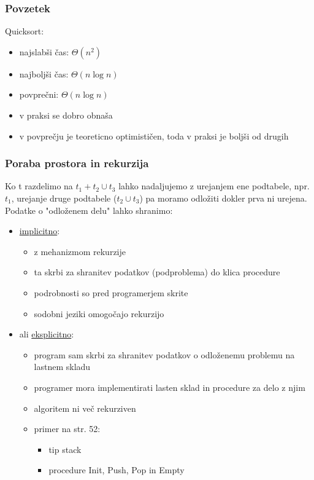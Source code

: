 \documentclass[a4paper,10pt]{article}
\begin{document}
\subsubsection{Povzetek}
Quicksort:
\begin{itemize}
\item najslab\v si  \v cas:  $\Theta(n^2)$
\item najbolj\v si  \v cas: $\Theta(n\log n)$
\item povpre\v cni: $\Theta (n\log n)$
\item v praksi se dobro obna\v sa
\item v povpre\v cju je teoreticno optimisti\v cen, toda v praksi je bolj\v si od drugih
\end{itemize}

\subsubsection{Poraba prostora in rekurzija}
Ko t razdelimo na $t_1 + t_2 \cup t_3$ lahko nadaljujemo z urejanjem ene podtabele, npr. $t_1$, urejanje druge podtabele ($t_2 \cup t_3$) pa moramo odlo\v ziti dokler prva ni urejena. Podatke o "odlo\v zenem delu" lahko shranimo:
\begin{itemize}
\item \underline{implicitno}:
	\begin{itemize}
	\item z mehanizmom rekurzije
	\item ta skrbi za shranitev podatkov (podproblema) do klica procedure
	\item podrobnosti so pred programerjem skrite
	\item sodobni jeziki omogo\v cajo rekurzijo
	\end{itemize}
\item ali \underline{eksplicitno}:
	\begin{itemize}
	\item program sam skrbi za shranitev podatkov o odlo\v zenemu problemu na lastnem skladu
	\item programer mora implementirati lasten sklad in procedure za delo z njim
	\item algoritem ni ve\v c rekurziven
	\item primer na str. 52:
		\begin{itemize}
		\item tip stack
		\item procedure Init, Push, Pop in Empty
		\end{itemize}
	\end{itemize}
\end{itemize}
\end{document}
